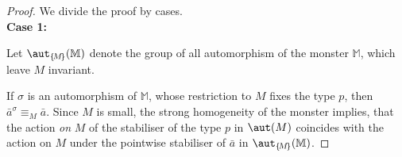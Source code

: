 \documentclass[11pt,english]{article}
\begin{document}
\begin{proof} We divide the proof by cases.\\[+0.7mm]\noindent
{\bf Case 1:}

\medskip
Let $\aut_{\{\!M\!\}}(\mathbb{M})$ denote the group of all automorphism of the monster $\mathbb{M}$,
which leave $M$ invariant.

If $\sigma$ is an automorphism of $\mathbb{M}$, whose restriction to ${M}$ fixes the type $p$,
then $\bar a^{\sigma}\equiv_{M}\bar a$.
%
Since $M$ is small, the strong homogeneity of the monster implies, that
the action {\em on} $M$ of the stabiliser of the type $p$ %
in $\aut(M)$ %
coincides with the action on $M$ %
under the pointwise stabiliser of %
$\bar a$ in $\aut_{\{\!M\!\}}(\mathbb{M})$. %




\end{proof}
\end{document}
